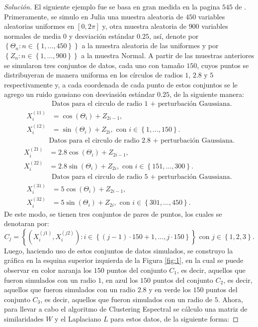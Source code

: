 \documentclass[10.5pt,notitlepage]{article}
\newenvironment{solucion}
  {\begin{proof}[Solución]}
  {\end{proof}}
\newcommand{\kis}[1]{\left\{ #1 \right\}}
\theoremstyle{plain}
\begin{document}
\begin{solucion}
El siguiente ejemplo fue se basa en gran medida en la pagina \(545\) de \textcite{hastie_elements_2009}. Primeramente, se simulo en Julia una muestra aleatoria de \(450\) variables aleatorias uniformes en \([0,2\pi]\) y, otra muestra aleatoria de \(900\) variables normales de media \(0\) y desviación estándar \(0.25\), así, denote por \(\kis{\Theta_n : n \in \kis{1, \hdots, 450}}\) a la muestra aleatoria de las uniformes y por \(\kis{Z_{n}: n \in \kis{1,\hdots,900}}\) a la muestra Normal. A partir de las muestras anteriores se simularon tres conjuntos de datos, cada uno con tamaño \(150\), cuyos puntos se distribuyeran de manera uniforma en los círculos de radios \(1\), \(2.8\) y \(5\) respectivamente y, a cada coordenada de cada punto de estos conjuntos se le agrego un ruido gausiano con desviasión estándar \(0.25\), de la siguiente manera:
\begin{align*}
    &\text{Datos para el circulo de radio 1 + perturbación Gaussiana.}\\
    X^{(11)}_{i} &= \cos(\Theta_{i}) + Z_{2i-1}, \\
    X^{(12)}_{i} &= \sin(\Theta_{i}) + Z_{2i}, \text{ con } i \in \kis{1, \hdots, 150 }.
\end{align*}
\begin{align*}
    &\text{Datos para el circulo de radio 2.8 + perturbación Gaussiana.}\\
    X^{(21)}_{i} &= 2.8\cos(\Theta_{i}) + Z_{2i-1}, \\
    X^{(22)}_{i} &= 2.8\sin(\Theta_{i}) + Z_{2i}, \text{ con } i \in \kis{151, \hdots, 300 }.
\end{align*}
\begin{align*}
    &\text{Datos para el circulo de radio 5 + perturbación Gaussiana.}\\
    X^{(31)}_{i} &= 5\cos(\Theta_{i}) + Z_{2i-1}, \\
    X^{(32)}_{i} &= 5\sin(\Theta_{i}) + Z_{2i}, \text{ con } i \in \kis{301, \hdots, 450 }.
\end{align*}
De este modo, se tienen tres conjuntos de pares de puntos, los cuales se denotaran por:
\[C_j = \kis{(X^{(j1)}_{i}, X^{(j2)}_i) : i \in \kis{(j-1)\cdot150 + 1, \hdots, j\cdot150}} \text{ con } j \in \kis{1,2,3}.\] 
Luego, haciendo uso de estos conjuntos de datos simulados, se construyo la gráfica en la esquina superior izquierda de la Figura \ref{fig:1}, en la cual se puede observar en color naranja los \(150\) puntos del conjunto \(C_1\), es decir, aquellos que fueron simulados con un radio \(1\), en azul los \(150\) puntos del conjunto \(C_2\), es decir, aquellos que fueron simulados con un radio \(2.8\) y en verde los \(150\) puntos del conjunto \(C_3\), es decir, aquellos que fueron simulados con un radio de \(5\). Ahora, para llevar a cabo el algoritmo de Clustering Espectral se cálculo una matriz de similaridades \(W\) y el Laplaciano \(L\) para estos datos, de la siguiente forma:

\end{solucion}
\end{document}

